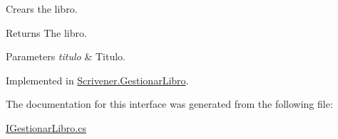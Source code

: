 Crears the libro. 

\begin{DoxyReturn}{Returns}
The libro. 
\end{DoxyReturn}

\begin{DoxyParams}{Parameters}
{\em titulo} & Titulo. \\
\hline
\end{DoxyParams}


Implemented in \hyperlink{class_scrivener_1_1_gestionar_libro_add24f11197da4fc4727beba28ddcc8fb}{Scrivener.\-Gestionar\-Libro}.



The documentation for this interface was generated from the following file\-:\begin{DoxyCompactItemize}
\item 
\hyperlink{_i_gestionar_libro_8cs}{I\-Gestionar\-Libro.\-cs}\end{DoxyCompactItemize}
